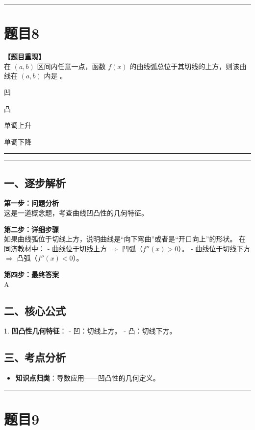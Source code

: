\documentclass[12pt, a4paper]{ctexart}
\newcommand{\TopSeparator}{
    \par\noindent\rule{\textwidth}{1.5pt}\vspace{0.5em} %
}
\newcommand{\AnalysisSeparator}{
    \par\noindent\rule{\textwidth}{0.5pt}\vspace{0.2em}\hrule\vspace{0.5em} %
}
\newenvironment{RedAnalysis}{
    \par
    \color{red} %
}{
    \par
    \color{black} %
}
\newcommand{\choicesFour}[4]{
    \begin{enumerate}[label=\Alph*., itemsep=0pt, parsep=0pt, topsep=5pt, labelsep=0.5em]
        \begin{minipage}{0.22\linewidth} \item #1 \end{minipage}
        \begin{minipage}{0.22\linewidth} \item #2 \end{minipage}
        \begin{minipage}{0.22\linewidth} \item #3 \end{minipage}
        \begin{minipage}{0.22\linewidth} \item #4 \end{minipage}
    \end{enumerate}
}
\begin{document}
\vspace{2em}

\TopSeparator
\section*{题目8}

\textbf{【题目重现】} \\
在 $ (a,b) $ 区间内任意一点，函数 $ f(x) $ 的曲线弧总位于其切线的上方，则该曲线在 $ (a,b) $ 内是 \underline{\hspace{1cm}}。
\choicesFour{凹}{凸}{单调上升}{单调下降}

\AnalysisSeparator

\begin{RedAnalysis}

\subsection*{一、逐步解析}

\textbf{第一步：问题分析} \\
这是一道概念题，考查曲线凹凸性的几何特征。

\textbf{第二步：详细步骤} \\
如果曲线弧位于切线上方，说明曲线是“向下弯曲”或者是“开口向上”的形状。
在同济教材中：
- 曲线位于切线上方 $\Rightarrow$ 凹弧（$f''(x) > 0$）。
- 曲线位于切线下方 $\Rightarrow$ 凸弧（$f''(x) < 0$）。

\textbf{第四步：最终答案} \\
A

\subsection*{二、核心公式}
1. \textbf{凹凸性几何特征}：
   - 凹：切线上方。
   - 凸：切线下方。

\subsection*{三、考点分析}
\begin{itemize}
    \item \textbf{知识点归类}：导数应用——凹凸性的几何定义。
\end{itemize}

\end{RedAnalysis}

\vspace{2em}

\TopSeparator
\section*{题目9}
\end{document}
